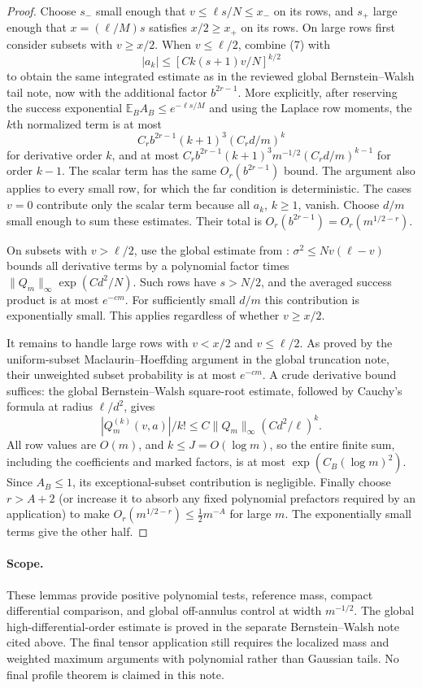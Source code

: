 \documentclass[11pt]{article}
\newcommand{\E}{\mathbb E}
\begin{document}
\begin{proof}
Choose $s_-$ small enough that $v\le\ell s/N\le x_-$ on its rows,
and $s_+$ large enough that $x=(\ell/M)s$ satisfies $x/2\ge x_+$
on its rows. On large rows first consider subsets with $v\ge x/2$.
When $v\le\ell/2$, combine (7) with
\[
 |a_k|\le[Ck(s+1)v/N]^{k/2}
\]
to obtain the same integrated estimate as in the reviewed global
Bernstein--Walsh tail note, now with the additional factor
$b^{2r-1}$. More explicitly, after reserving the success exponential
$\E_BA_B\le e^{-\ell s/M}$ and using the Laplace row moments, the
$k$th normalized term is at most
\[
 C_rb^{2r-1}(k+1)^3(C_r d/m)^k
\]
for derivative order $k$, and at most
$C_rb^{2r-1}(k+1)^3m^{-1/2}(C_r d/m)^{k-1}$ for order $k-1$.
The scalar term has the same $O_r(b^{2r-1})$ bound.
The argument also applies to every small row, for which the far
condition is deterministic. The cases $v=0$ contribute only the
scalar term because all $a_k$, $k\ge1$, vanish.
Choose $d/m$ small enough to sum these estimates. Their total is
$O_r(b^{2r-1})=O_r(m^{1/2-r})$.

On subsets with $v>\ell/2$, use the global estimate from
:
$\sigma^2\le Nv(\ell-v)$ bounds all derivative terms by a polynomial
factor times $\|Q_m\|_\infty\exp(Cd^2/N)$.
Such rows have $s>N/2$, and the averaged success product is at most
$e^{-cm}$. For sufficiently small $d/m$ this contribution is
exponentially small. This applies regardless of whether $v\ge x/2$.

It remains to handle large rows with $v<x/2$ and $v\le\ell/2$.
As proved by the uniform-subset Maclaurin--Hoeffding argument in the
global truncation note, their unweighted subset probability is at
most $e^{-cm}$. A crude derivative bound suffices: the global
Bernstein--Walsh square-root estimate, followed by Cauchy's formula
at radius $\ell/d^2$, gives
\[
 |Q_m^{(k)}(v,a)|/k!\le
 C\|Q_m\|_\infty(Cd^2/\ell)^k.
\]
All row values are $O(m)$, and $k\le J=O(\log m)$, so the entire
finite sum, including the coefficients and marked factors, is at
most $\exp(C_B(\log m)^2)$. Since $A_B\le1$, its exceptional-subset
contribution is negligible. Finally choose $r>A+2$ (or increase it
to absorb any fixed polynomial prefactors required by an application)
to make $O_r(m^{1/2-r})\le\tfrac12m^{-A}$ for large $m$.
The exponentially small terms give the other half.
\end{proof}

\paragraph{Scope.}
These lemmas provide positive polynomial tests, reference mass,
compact differential comparison, and global off-annulus control at
width $m^{-1/2}$. The global high-differential-order estimate is proved
in the separate Bernstein--Walsh note cited above. The final tensor
application still requires the localized mass and weighted maximum
arguments with polynomial rather than Gaussian tails. No final profile
theorem is claimed in this note.
\end{document}
